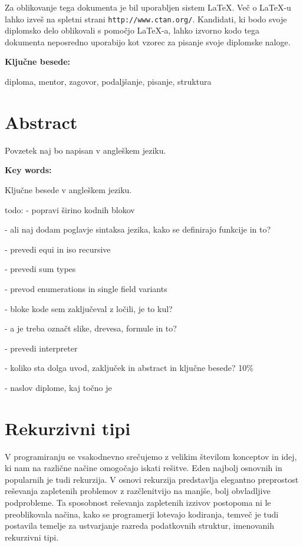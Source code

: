 \documentclass[12pt,a4paper,openany]{book}
\begin{document}
Za oblikovanje tega dokumenta je bil uporabljen sistem \LaTeX.
Ve\v c o \LaTeX-u lahko izve\v s na spletni strani \texttt{http://www.ctan.org/}.
Kandidati, ki bodo svoje diplomsko delo oblikovali s pomo\v cjo
\LaTeX-a, lahko izvorno kodo tega dokumenta neposredno uporabijo kot vzorec za pisanje svoje diplomske naloge.

\vspace{1.3cm}
\noindent
{\large \bf Ključne besede:}

\vspace{0.5cm}
\noindent
diploma, mentor, zagovor, podaljšanje, pisanje, struktura


\chapter*{Abstract}


Povzetek naj bo napisan v angleškem jeziku.

\vspace{1.3cm}
\noindent
{\large \bf Key words:}

\vspace{0.5cm}
\noindent
Ključne besede v angleškem jeziku.



todo: 
- popravi širino kodnih blokov 

- ali naj dodam poglavje sintaksa jezika, kako se definirajo funkcije in to? 

- prevedi equi in iso recursive

- prevedi sum types

- prevod enumerations in single field variants

- bloke kode sem zaključeval z ločili, je to kul?

- a je treba označt slike, drevesa, formule in to?

- prevedi interpreter

- koliko sta dolga uvod, zaključek in abstract in ključne besede? 10\% 

- naslov diplome, kaj točno je




\newpage
\chapter{Rekurzivni tipi}
V programiranju se vsakodnevno srečujemo z velikim številom konceptov in idej, ki nam na različne načine omogočajo iskati rešitve. Eden najbolj osnovnih in popularnih je tudi rekurzija.
V osnovi rekurzija predstavlja elegantno preprostost reševanja zapletenih problemov z razčlenitvijo na manjše, bolj obvladljive podprobleme. Ta sposobnost reševanja zapletenih izzivov 
postopoma ni le preoblikovala načina, kako se programerji lotevajo kodiranja, temveč je tudi postavila temelje za ustvarjanje razreda podatkovnih struktur, imenovanih rekurzivni tipi.
\end{document}
